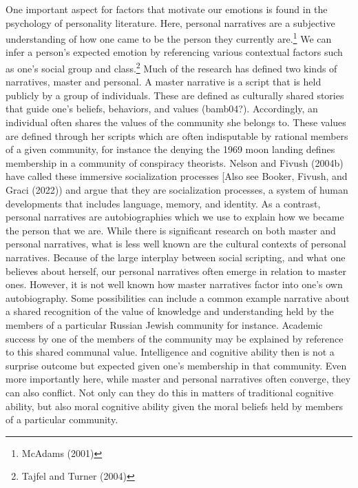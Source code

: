 \documentclass[12pt]{book}
\theoremstyle{definition}
\theoremstyle{remark}
\begin{document}
One important aspect for factors that motivate our emotions is found in the psychology of personality literature. Here, personal narratives are a subjective understanding of how one came to be the person they currently are.\footnote{McAdams (2001)} We can infer a person's expected emotion by referencing various contextual factors such as one's social group and class.\footnote{Tajfel and Turner (2004)} Much of the research has defined two kinds of narratives, master and personal. A master narrative is a script that is held publicly by a group of individuals. These are defined as culturally shared stories that guide one's beliefs, behaviors, and values (bamb04?). Accordingly, an individual often shares the values of the community she belongs to. These values are defined through her scripts which are often indisputable by rational members of a given community, for instance the denying the 1969 moon landing defines membership in a community of conspiracy theorists. Nelson and Fivush (2004b) have called these immersive socialization processes {[}Also see Booker, Fivush, and Graci (2022)) and argue that they are socialization processes, a system of human developments that includes language, memory, and identity. As a contrast, personal narratives are autobiographies which we use to explain how we became the person that we are. While there is significant research on both master and personal narratives, what is less well known are the cultural contexts of personal narratives. Because of the large interplay between social scripting, and what one believes about herself, our personal narratives often emerge in relation to master ones. However, it is not well known how master narratives factor into one's own autobiography. Some possibilities can include a common example narrative about a shared recognition of the value of knowledge and understanding held by the members of a particular Russian Jewish community for instance. Academic success by one of the members of the community may be explained by reference to this shared communal value. Intelligence and cognitive ability then is not a surprise outcome but expected given one's membership in that community. Even more importantly here, while master and personal narratives often converge, they can also conflict. Not only can they do this in matters of traditional cognitive ability, but also moral cognitive ability given the moral beliefs held by members of a particular community.
\end{document}
